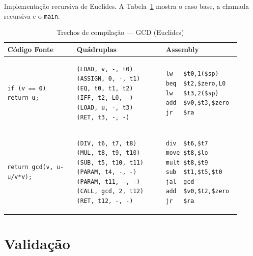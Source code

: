 \documentclass[
	12pt,				%
	openright,			%
	a4paper,			%
	english,			%
	french,				%
	spanish,			%
	brazil,				%
	]{abntex2}
\begin{document}
Implementação recursiva de Euclides. A Tabela~\ref{tab:gcd} mostra o caso base, a chamada recursiva e o \texttt{main}.

\begin{table}[H]
\centering
\caption{Trechos de compilação — GCD (Euclides)}
\label{tab:gcd}
\footnotesize
\begin{tabular}{|p{0.28\linewidth}|p{0.36\linewidth}|p{0.30\linewidth}|}
\hline
\textbf{Código Fonte} & \textbf{Quádruplas} & \textbf{Assembly} \\
\hline
\begin{verbatim}
if (v == 0) return u;
\end{verbatim}
&
\begin{verbatim}
(LOAD, v, -, t0)
(ASSIGN, 0, -, t1)
(EQ, t0, t1, t2)
(IFF, t2, L0, -)
(LOAD, u, -, t3)
(RET, t3, -, -)
\end{verbatim}
&
\begin{verbatim}
lw   $t0,1($sp)
beq  $t2,$zero,L0
lw   $t3,2($sp)
add  $v0,$t3,$zero
jr   $ra
\end{verbatim}
\\
\hline
\begin{verbatim}
return gcd(v, u-u/v*v);
\end{verbatim}
&
\begin{verbatim}
(DIV, t6, t7, t8)
(MUL, t8, t9, t10)
(SUB, t5, t10, t11)
(PARAM, t4, -, -)
(PARAM, t11, -, -)
(CALL, gcd, 2, t12)
(RET, t12, -, -)
\end{verbatim}
&
\begin{verbatim}
div  $t6,$t7
move $t8,$lo
mult $t8,$t9
sub  $t1,$t5,$t0
jal  gcd
add  $v0,$t2,$zero
jr   $ra
\end{verbatim}
\\
\hline
\begin{verbatim}
output(gcd(x, y));
\end{verbatim}
&
\begin{verbatim}
(CALL, gcd, 2, t17)
(PARAM, t17, -, -)
(CALL_O, t17, -, -)
\end{verbatim}
&
\begin{verbatim}
jal  gcd
out  $t7
hlt
\end{verbatim}
\\
\hline
\end{tabular}
\end{table}

\section{Validação}
\end{document}
